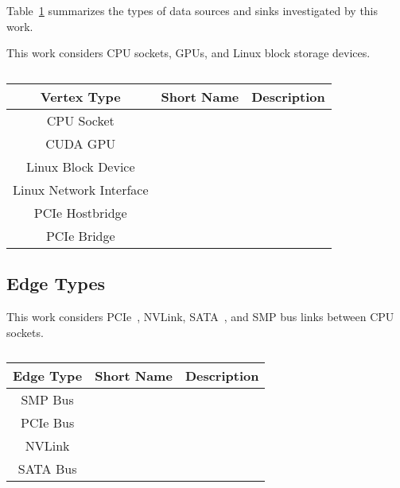Table~\ref{tab:topology-vertices} summarizes the types of data sources and sinks investigated by this work.

This work considers CPU sockets, GPUs, and Linux block storage devices.

\begin{table}[]
    \centering
    \caption[Discoverable vertex types]{}
    \label{tab:topology-vertices}
    \begin{tabular}{|c|c|c|}
    \hline
    \textbf{Vertex Type}    & \textbf{Short Name} & \textbf{Description} \\ \hline
    CPU Socket              &                     &                      \\ \hline
    CUDA GPU                &                     &                      \\ \hline
    Linux Block Device      &                     &                      \\ \hline
    Linux Network Interface &                     &                      \\ \hline
    PCIe Hostbridge         &                     &                      \\ \hline
    PCIe Bridge             &                     &                      \\ \hline
    \end{tabular}
\end{table}

\subsection{Edge Types}
\label{sec:system-edges}

This work considers PCIe~, NVLink\cite{nvidia2017nvlink}, SATA~, and SMP bus links between CPU sockets.

\begin{table}[]
    \centering
    \caption[Discoverable edge types]{}
    \label{tab:topology-edges}
    \begin{tabular}{|c|c|c|}
    \hline
    \textbf{Edge Type} & \textbf{Short Name} & \textbf{Description} \\ \hline
    SMP Bus            &                     &                      \\ \hline
    PCIe Bus           &                     &                      \\ \hline
    NVLink             &                     &                      \\ \hline
    SATA Bus           &                     &                      \\ \hline
    \end{tabular}
\end{table}


